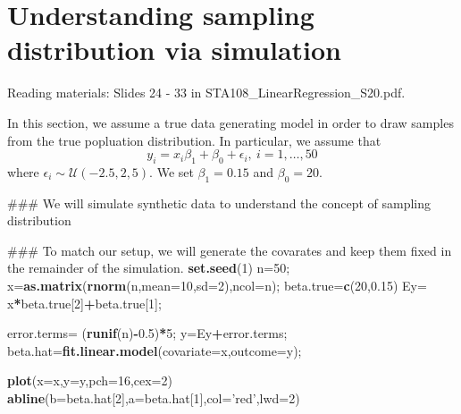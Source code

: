 \documentclass[12pt,]{book}
\newenvironment{Shaded}{\begin{snugshade}}{\end{snugshade}}
\newcommand{\KeywordTok}[1]{\textcolor[rgb]{0.13,0.29,0.53}{\textbf{#1}}}
\newcommand{\DataTypeTok}[1]{\textcolor[rgb]{0.13,0.29,0.53}{#1}}
\newcommand{\DecValTok}[1]{\textcolor[rgb]{0.00,0.00,0.81}{#1}}
\newcommand{\FloatTok}[1]{\textcolor[rgb]{0.00,0.00,0.81}{#1}}
\newcommand{\StringTok}[1]{\textcolor[rgb]{0.31,0.60,0.02}{#1}}
\newcommand{\OperatorTok}[1]{\textcolor[rgb]{0.81,0.36,0.00}{\textbf{#1}}}
\newcommand{\NormalTok}[1]{#1}
\begin{document}
\section{Understanding sampling distribution via
simulation}\label{understanding-sampling-distribution-via-simulation}

Reading materials: Slides 24 - 33 in STA108\_LinearRegression\_S20.pdf.

In this section, we assume a true data generating model in order to draw
samples from the true popluation distribution. In particular, we assume
that \[ y_i = x_i \beta_1 + \beta_0 + \epsilon_i, \ i=1,\ldots, 50\]
where \(\epsilon_i \sim {\mathcal{U}}(-2.5, 2,5)\). We set
\(\beta_1=0.15\) and \(\beta_0=20\).

\begin{Shaded}
\begin{Highlighting}[]
\NormalTok{### We will simulate synthetic data to understand the concept of sampling distribution}

\NormalTok{### To match our setup, we will generate the covarates and keep them fixed in the remainder of the simulation. }
\KeywordTok{set.seed}\NormalTok{(}\DecValTok{1}\NormalTok{)}
\NormalTok{n=}\DecValTok{50}\NormalTok{;}
\NormalTok{x=}\KeywordTok{as.matrix}\NormalTok{(}\KeywordTok{rnorm}\NormalTok{(n,}\DataTypeTok{mean=}\DecValTok{10}\NormalTok{,}\DataTypeTok{sd=}\DecValTok{2}\NormalTok{),}\DataTypeTok{ncol=}\NormalTok{n);}
\NormalTok{beta.true=}\KeywordTok{c}\NormalTok{(}\DecValTok{20}\NormalTok{,}\FloatTok{0.15}\NormalTok{)}
\NormalTok{Ey=}\StringTok{ }\NormalTok{x}\OperatorTok{*}\NormalTok{beta.true[}\DecValTok{2}\NormalTok{]}\OperatorTok{+}\NormalTok{beta.true[}\DecValTok{1}\NormalTok{];}

\NormalTok{error.terms=}\StringTok{ }\NormalTok{(}\KeywordTok{runif}\NormalTok{(n)}\OperatorTok{-}\FloatTok{0.5}\NormalTok{)}\OperatorTok{*}\DecValTok{5}\NormalTok{;}
\NormalTok{y=Ey}\OperatorTok{+}\NormalTok{error.terms;}
\NormalTok{beta.hat=}\KeywordTok{fit.linear.model}\NormalTok{(}\DataTypeTok{covariate=}\NormalTok{x,}\DataTypeTok{outcome=}\NormalTok{y);}


\KeywordTok{plot}\NormalTok{(}\DataTypeTok{x=}\NormalTok{x,}\DataTypeTok{y=}\NormalTok{y,}\DataTypeTok{pch=}\DecValTok{16}\NormalTok{,}\DataTypeTok{cex=}\DecValTok{2}\NormalTok{)}
\KeywordTok{abline}\NormalTok{(}\DataTypeTok{b=}\NormalTok{beta.hat[}\DecValTok{2}\NormalTok{],}\DataTypeTok{a=}\NormalTok{beta.hat[}\DecValTok{1}\NormalTok{],}\DataTypeTok{col=}\StringTok{'red'}\NormalTok{,}\DataTypeTok{lwd=}\DecValTok{2}\NormalTok{)}
\end{Highlighting}
\end{Shaded}
\end{document}
